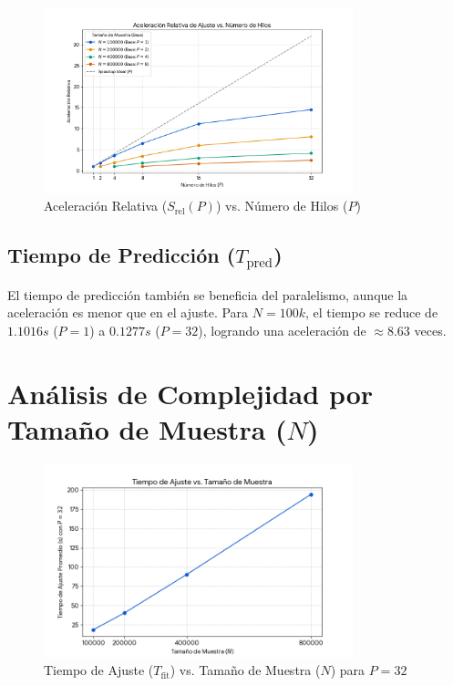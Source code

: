\documentclass{article}
\begin{document}
\begin{figure}[H]
    \centering
    \includegraphics[width=0.8\textwidth]{speedup_vs_n_jobs.png}
    \caption{Aceleración Relativa ($S_{\text{rel}}(P)$) vs. Número de Hilos ($P$)}
    \label{fig:speedup_vs_n_jobs}
\end{figure}

\subsection{Tiempo de Predicción ($T_{\text{pred}}$)}
El tiempo de predicción también se beneficia del paralelismo, aunque la aceleración es menor que en el ajuste. Para $N=100k$, el tiempo se reduce de $1.1016s$ ($P=1$) a $0.1277s$ ($P=32$), logrando una aceleración de $\approx 8.63$ veces.

\section{Análisis de Complejidad por Tamaño de Muestra ($N$)}

\begin{figure}[H]
    \centering
    \includegraphics[width=0.8\textwidth]{fit_time_vs_n_jobs.png}
    \caption{Tiempo de Ajuste ($T_{\text{fit}}$) vs. Tamaño de Muestra ($N$) para $P=32$}
    \label{fig:fit_time_vs_n_samples_p32}
\end{figure}
\end{document}
